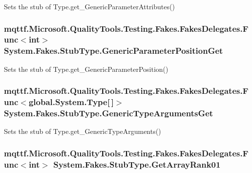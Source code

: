 Sets the stub of Type.\-get\-\_\-\-Generic\-Parameter\-Attributes()

\hypertarget{class_system_1_1_fakes_1_1_stub_type_a82066736482e0b9313caa87f60b262e2}{
\subsubsection[{Generic\-Parameter\-Position\-Get}]{\setlength{\rightskip}{0pt plus 5cm}mqttf.\-Microsoft.\-Quality\-Tools.\-Testing.\-Fakes.\-Fakes\-Delegates.\-Func$<$int$>$ System.\-Fakes.\-Stub\-Type.\-Generic\-Parameter\-Position\-Get}}\label{class_system_1_1_fakes_1_1_stub_type_a82066736482e0b9313caa87f60b262e2}


Sets the stub of Type.\-get\-\_\-\-Generic\-Parameter\-Position()

\hypertarget{class_system_1_1_fakes_1_1_stub_type_a16787b80f78426afb73499a5345a8b8b}{
\subsubsection[{Generic\-Type\-Arguments\-Get}]{\setlength{\rightskip}{0pt plus 5cm}mqttf.\-Microsoft.\-Quality\-Tools.\-Testing.\-Fakes.\-Fakes\-Delegates.\-Func$<$global.\-System.\-Type\mbox{[}$\,$\mbox{]}$>$ System.\-Fakes.\-Stub\-Type.\-Generic\-Type\-Arguments\-Get}}\label{class_system_1_1_fakes_1_1_stub_type_a16787b80f78426afb73499a5345a8b8b}


Sets the stub of Type.\-get\-\_\-\-Generic\-Type\-Arguments()

\hypertarget{class_system_1_1_fakes_1_1_stub_type_a5bc703f4f72f6cea430a19d056cd1b5d}{
\subsubsection[{Get\-Array\-Rank01}]{\setlength{\rightskip}{0pt plus 5cm}mqttf.\-Microsoft.\-Quality\-Tools.\-Testing.\-Fakes.\-Fakes\-Delegates.\-Func$<$int$>$ System.\-Fakes.\-Stub\-Type.\-Get\-Array\-Rank01}}\label{class_system_1_1_fakes_1_1_stub_type_a5bc703f4f72f6cea430a19d056cd1b5d}


